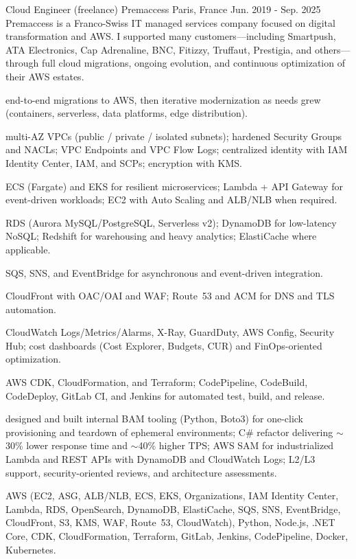 \begin{cventries}
  \cventrywithintro
    {Cloud Engineer (freelance)}
    {Premaccess}
    {Paris, France}
    {Jun. 2019 - Sep. 2025}
    {Premaccess is a Franco-Swiss IT managed services company focused on digital transformation and  AWS. I supported many customers---including Smartpush, ATA Electronics, Cap Adrenaline, BNC, Fitizzy, Truffaut, Prestigia, and others---through full cloud migrations, ongoing evolution, and continuous optimization of their AWS estates.}
    {
      \begin{cvitemsafterintro}
        \item { end-to-end migrations to AWS, then iterative modernization as needs grew (containers, serverless, data platforms, edge distribution).}
        \item { multi-AZ VPCs (public / private / isolated subnets); hardened Security Groups and NACLs; VPC Endpoints and VPC Flow Logs; centralized identity with IAM Identity Center, IAM, and SCPs; encryption with KMS.}
        \item { ECS (Fargate) and EKS for resilient microservices; Lambda + API Gateway for event-driven workloads; EC2 with Auto Scaling and ALB/NLB when required.}
        \item { RDS (Aurora MySQL/PostgreSQL, Serverless v2); DynamoDB for low-latency NoSQL; Redshift for warehousing and heavy analytics; ElastiCache where applicable.}
        \item { SQS, SNS, and EventBridge for asynchronous and event-driven integration.}
        \item { CloudFront with OAC/OAI and WAF; Route~53 and ACM for DNS and TLS automation.}
        \item { CloudWatch Logs/Metrics/Alarms, X-Ray, GuardDuty, AWS Config, Security Hub; cost dashboards (Cost Explorer, Budgets, CUR) and FinOps-oriented optimization.}
        \item { AWS CDK, CloudFormation, and Terraform; CodePipeline, CodeBuild, CodeDeploy, GitLab CI, and Jenkins for automated test, build, and release.}
        \item { designed and built internal BAM tooling (Python, Boto3) for one-click provisioning and teardown of ephemeral environments; C\# refactor delivering $\sim$30\% lower response time and $\sim$40\% higher TPS; AWS SAM for industrialized Lambda and REST APIs with DynamoDB and CloudWatch Logs; L2/L3 support, security-oriented reviews, and architecture assessments.}
      \end{cvitemsafterintro}
    }
    {AWS (EC2, ASG, ALB/NLB, ECS, EKS, Organizations, IAM Identity Center, Lambda, RDS, OpenSearch, DynamoDB, ElastiCache, SQS, SNS, EventBridge, CloudFront, S3, KMS, WAF, Route~53, CloudWatch), Python, Node.js, .NET Core, CDK, CloudFormation, Terraform, GitLab, Jenkins, CodePipeline, Docker, Kubernetes.}


\end{cventries}
